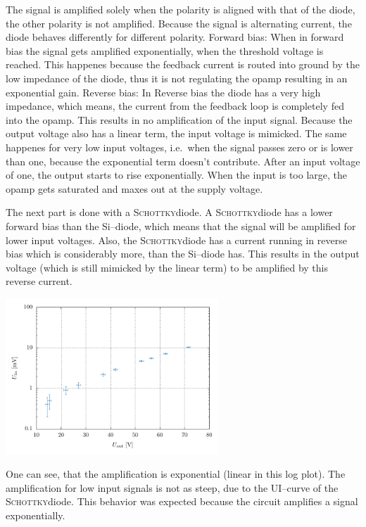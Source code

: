 \documentclass[a4paper,10pt]{article}
\newenvironment{Figure}
        {\par\medskip\noindent\minipage{\linewidth}}
        {\endminipage\par\medskip} %
\numberwithin{equation}{section}
\begin{document}
\begin{multicols}{2}
        The signal is amplified solely when the polarity is aligned with that of the diode, the other polarity is not amplified.
        Because the signal is alternating current, the diode behaves differently for different polarity.
        Forward bias: 
        When in forward bias the signal gets amplified exponentially, when the threshold voltage is reached.
        This happenes because the feedback current is routed into ground by the low impedance of the diode, thus it is not regulating the opamp resulting in an exponential gain.
        Reverse bias: 
        In Reverse bias the diode has a very high impedance, which means, the current from the feedback loop is completely fed into the opamp.
        This results in no amplification of the input signal.
        Because the output voltage also has a linear term, the input voltage is mimicked.
        The same happenes for very low input voltages, i.e.\ when the signal passes zero or is lower than one, because the exponential term doesn't contribute.
        After an input voltage of one, the output starts to rise exponentially.
        When the input is too large, the opamp gets saturated and maxes out at the supply voltage.\par
        The next part is done with a \textsc{Schottky}diode.
        A \textsc{Schottky}diode has a lower forward bias than the Si--diode, which means that the signal will be amplified for lower input voltages.
        Also, the \textsc{Schottky}diode has a current running in reverse bias which is considerably more, than the Si--diode has.
        This results in the output voltage (which is still mimicked by the linear term) to be amplified by this reverse current.
        \begin{Figure}
                \centering
                \includegraphics[width=0.6\textwidth]{../plot/6_1_2_crop.pdf}
        \end{Figure}
        \noindent One can see, that the amplification is exponential (linear in this log plot).
        The amplification for low input signals is not as steep, due to the UI--curve of the \textsc{Schottky}diode.
        This behavior was expected because the circuit amplifies a signal exponentially.
\end{multicols}

\clearpage
\listoffigures
\listoftables



\end{document}
